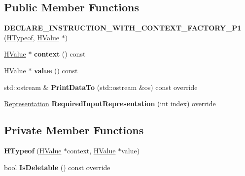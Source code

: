 \subsection*{Public Member Functions}
\begin{DoxyCompactItemize}
\item 
{\bfseries D\+E\+C\+L\+A\+R\+E\+\_\+\+I\+N\+S\+T\+R\+U\+C\+T\+I\+O\+N\+\_\+\+W\+I\+T\+H\+\_\+\+C\+O\+N\+T\+E\+X\+T\+\_\+\+F\+A\+C\+T\+O\+R\+Y\+\_\+\+P1} (\hyperlink{classv8_1_1internal_1_1_h_typeof}{H\+Typeof}, \hyperlink{classv8_1_1internal_1_1_h_value}{H\+Value} $\ast$)\hypertarget{classv8_1_1internal_1_1_h_typeof_aa87c19d3d1ec8fed7ce199a169490969}{}\label{classv8_1_1internal_1_1_h_typeof_aa87c19d3d1ec8fed7ce199a169490969}

\item 
\hyperlink{classv8_1_1internal_1_1_h_value}{H\+Value} $\ast$ {\bfseries context} () const \hypertarget{classv8_1_1internal_1_1_h_typeof_a48372d37276931bfea62e7a66dbfb4de}{}\label{classv8_1_1internal_1_1_h_typeof_a48372d37276931bfea62e7a66dbfb4de}

\item 
\hyperlink{classv8_1_1internal_1_1_h_value}{H\+Value} $\ast$ {\bfseries value} () const \hypertarget{classv8_1_1internal_1_1_h_typeof_a76e46bfa70243bf6dc66f0a71be51112}{}\label{classv8_1_1internal_1_1_h_typeof_a76e46bfa70243bf6dc66f0a71be51112}

\item 
std\+::ostream \& {\bfseries Print\+Data\+To} (std\+::ostream \&os) const  override\hypertarget{classv8_1_1internal_1_1_h_typeof_ae35a86b937420eda209477628dd8b4b8}{}\label{classv8_1_1internal_1_1_h_typeof_ae35a86b937420eda209477628dd8b4b8}

\item 
\hyperlink{classv8_1_1internal_1_1_representation}{Representation} {\bfseries Required\+Input\+Representation} (int index) override\hypertarget{classv8_1_1internal_1_1_h_typeof_af1fa3f521a9bb1f6064f966861d3df7b}{}\label{classv8_1_1internal_1_1_h_typeof_af1fa3f521a9bb1f6064f966861d3df7b}

\end{DoxyCompactItemize}
\subsection*{Private Member Functions}
\begin{DoxyCompactItemize}
\item 
{\bfseries H\+Typeof} (\hyperlink{classv8_1_1internal_1_1_h_value}{H\+Value} $\ast$context, \hyperlink{classv8_1_1internal_1_1_h_value}{H\+Value} $\ast$value)\hypertarget{classv8_1_1internal_1_1_h_typeof_aa21fd0854e31611b92d3e7029a0d5bf5}{}\label{classv8_1_1internal_1_1_h_typeof_aa21fd0854e31611b92d3e7029a0d5bf5}

\item 
bool {\bfseries Is\+Deletable} () const  override\hypertarget{classv8_1_1internal_1_1_h_typeof_a78978da8292d517e9f77f5b957b193e8}{}\label{classv8_1_1internal_1_1_h_typeof_a78978da8292d517e9f77f5b957b193e8}

\end{DoxyCompactItemize}
